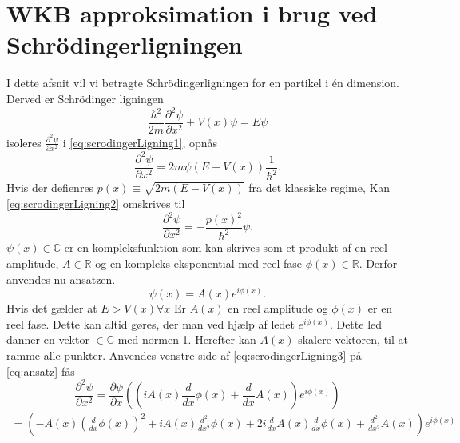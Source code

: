 \section{WKB approksimation i brug ved Schrödingerligningen}
I dette afsnit vil vi betragte Schrödingerligningen for en partikel i én dimension. Derved er Schrödinger ligningen
%
\begin{equation}
    \frac{\hbar^2}{2m}\frac{\partial^2 \psi}{\partial x^2} + V(x) \psi = E \psi
    \label{eq:scrodingerLigning1}
\end{equation}
%
isoleres $\frac{\partial^2 \psi}{\partial x^2}$ i \cref{eq:scrodingerLigning1}, opnås
%
\begin{equation}
    \frac{\partial^2 \psi}{\partial x^2} = 2m\psi (E  - V(x)) \frac{1}{\hbar^2}.
    \label{eq:scrodingerLigning2}
\end{equation}
%
Hvis der defienres $p(x) \equiv \sqrt{2m(E-V(x))}$ fra det klassiske regime, Kan \cref{eq:scrodingerLigning2} omskrives til
%
\begin{equation}
    \frac{\partial^2 \psi}{\partial x^2} = - \frac{p(x)^2}{\hbar^2} \psi.
    \label{eq:scrodingerLigning3}
\end{equation}
%
$\psi(x) \in \mathbb{C}$ er en kompleksfunktion som kan skrives som et produkt af en reel amplitude, $A \in \mathbb{R}$ og en kompleks eksponential med reel fase $\phi(x)\in \mathbb{R}$. Derfor anvendes nu ansatzen.
%
\begin{equation}
    \psi(x) = A(x) e^{i \phi(x)}.
    \label{eq:ansatz}
\end{equation}
%
Hvis det gælder at $ E > V(x) \forall x$ Er $A(x)$ en reel amplitude og $\phi(x)$ er en reel fase. Dette kan altid gøres, der man ved hjælp af ledet  $e^{i \phi(x)} $. Dette led danner en vektor $ \in \mathbb{C}$ med normen 1. Herefter kan $A(x)$  skalere vektoren, til at ramme alle punkter. Anvendes venstre side af \cref{eq:scrodingerLigning3} på \cref{eq:ansatz} fås
%
\begin{equation}
    \frac{\partial^2 \psi}{\partial x^2} = \frac{\partial \psi}{\partial x} \left( \left(i A{\left (x \right )} \frac{d}{d x} \phi{\left (x \right )} + \frac{d}{d x} A{\left (x \right )}\right) e^{i \phi{\left (x \right)}} \right)
    \label{eq:diff1gange}
\end{equation}
%
\begin{align}
    = \left(- A{\left (x \right )} \left(\frac{d}{d x} \phi{\left (x \right )}\right)^{2} + i A{\left (x \right )} \frac{d^{2}}{d x^{2}}  \phi{\left (x \right )} + 2 i \frac{d}{d x} A{\left (x \right )} \frac{d}{d x} \phi{\left (x \right )} + \frac{d^{2}}{d x^{2}}  A{\left (x \right )}\right) e^{i \phi{\left (x \right )}}
    \label{eq:diff2gange}
\end{align}
